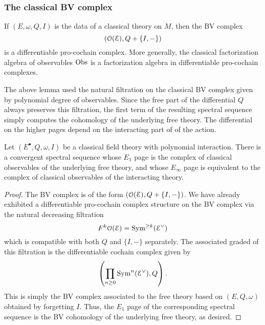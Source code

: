 \documentclass[10pt, oneside]{article}
\begin{document}
\subsubsection{The classical BV complex}

\begin{lem}
If $(E, \omega, Q, I)$ is the data of a classical theory on $M$, then the BV complex
\[
\left(\mathcal O(\mathcal E) , Q + \{I,-\}\right)
\]
is a differentiable pro-cochain complex.
More generally, the classical factorization algebra of observables $\mathrm{Obs}$ is a factorization algebra in differentiable pro-cochain complexes. 
\end{lem}

The above lemma used the natural filtration on the classical BV complex given by polynomial degree of observables. 
Since the free part of the differential $Q$ always preserves this filtration, the first term of the resulting spectral sequence simply computes the cohomology of the underlying free theory. 
The differential on the higher pages depend on the interacting part of of the action. 

\begin{lemma} \label{free_int_ss_lemma}
Let $(E^\bullet, Q, \omega, I)$ be a classical field theory with polynomial interaction.  
There is a convergent spectral sequence whose $E_1$ page is the complex of classical observables of the underlying free theory, and whose $E_\infty$ page is equivalent to the complex of classical observables of the interacting theory.
\end{lemma}
\begin{proof}
The BV complex is of the form $\left(\mathcal O(\mathcal E), Q + \{I,-\}\right)$.
We have already exhibited  a differentiable pro-cochain complex structure on the BV complex via the 
natural decreasing filtration 
\[
F^k \mathcal O (\mathcal E) = {\rm Sym}^{\geq k} (\mathcal E^\vee)
\]
which is compatible with both $Q$ and $\{I,-\}$ separately.
The associated graded of this filtration is the differentiable cochain complex given by
\[
\left(\prod_{n \geq 0} {\rm Sym}^n (\mathcal E^\vee) , Q \right) .
\]
This is simply the BV complex associated to the free theory based on $(E, Q, \omega)$ obtained by forgetting $I$. 
Thus, the $E_1$ page of the corresponding spectral sequence is the BV cohomology of the underlying free theory, as desired. 
 
\end{proof}
\end{document}
